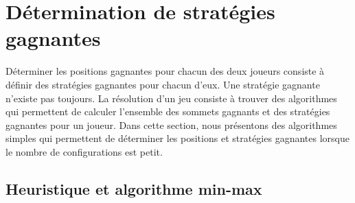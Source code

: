 \documentclass[12pt,fancy]{cours}
\begin{document}
\section{Détermination de stratégies gagnantes}

Déterminer les positions gagnantes pour chacun des deux joueurs consiste à définir des stratégies gagnantes pour chacun d'eux. Une stratégie gagnante n'existe pas toujours. La résolution d'un jeu consiste à trouver des algorithmes qui permettent de calculer l'ensemble des sommets gagnants et des stratégies gagnantes pour un joueur. Dans cette section, nous présentons des algorithmes simples qui permettent de déterminer les positions et stratégies gagnantes lorsque le nombre de configurations est petit.


\subsection{Heuristique et algorithme min-max}
\end{document}

